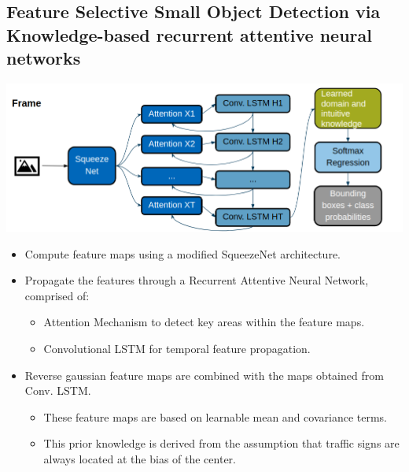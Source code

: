 \documentclass[conference]{IEEEtran}
\begin{document}
\subsection{Feature Selective Small Object Detection via Knowledge-based recurrent attentive neural networks}
\includegraphics[width=\columnwidth]{KB-RANN-architecture}
\begin{itemize}
	\item Compute feature maps using a modified SqueezeNet architecture.
	\item Propagate the features through a Recurrent Attentive Neural Network, comprised of:
	\begin{itemize}
		\item Attention Mechanism to detect key areas within the feature maps.
		\item Convolutional LSTM for temporal feature propagation.	
	\end{itemize}
	\item Reverse gaussian feature maps are combined with the maps obtained from Conv. LSTM.
	\begin{itemize}
		\item These feature maps are based on learnable mean and covariance terms.
		\item This prior knowledge is derived from the assumption that traffic signs are always located at the bias of the center.

	\end{itemize}
\end{itemize}
\end{document}
